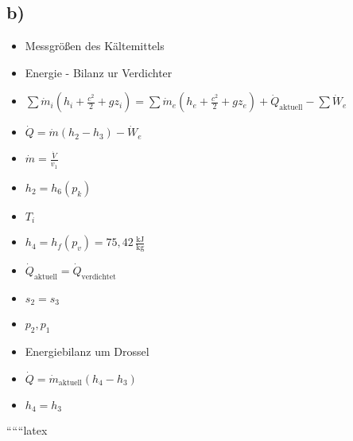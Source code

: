 

\subsection*{b)}

\begin{itemize}
    \item Messgrößen des Kältemittels
    \item Energie - Bilanz ur Verdichter
    \item \(\sum \dot{m}_i (h_i + \frac{c^2}{2} + g z_i) = \sum \dot{m}_e (h_e + \frac{c^2}{2} + g z_e) + \dot{Q}_{\text{aktuell}} - \sum \dot{W}_e\)
    \item \(\dot{Q} = \dot{m} (h_2 - h_3) - \dot{W}_e\)
    \item \(\dot{m} = \frac{\dot{V}}{v_1}\)
    \item \(h_2 = h_6 (p_{k})\)
    \item \(T_i\)
    \item \(h_4 = h_f (p_{v}) = 75,42 \, \frac{\text{kJ}}{\text{kg}}\)
    \item \(\dot{Q}_{\text{aktuell}} = \dot{Q}_{\text{verdichtet}}\)
    \item \(s_2 = s_3\)
    \item \(p_2, p_1\)
    \item Energiebilanz um Drossel
    \item \(\dot{Q} = \dot{m}_{\text{aktuell}} (h_4 - h_3)\)
    \item \(h_4 = h_3\)
\end{itemize}

``````latex